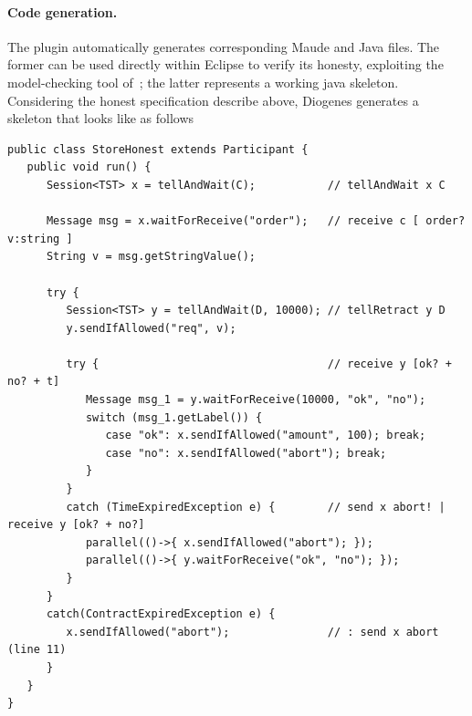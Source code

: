 \paragraph{Code generation.}
The plugin automatically generates corresponding Maude and Java files.
The former can be used directly within Eclipse to verify its honesty,
exploiting the model-checking tool of~\cite{verifiable};
the latter represents a working java skeleton. 
Considering the honest specification describe above,
Diogenes generates a skeleton that looks like as follows
\begin{mdframed}
\begin{verbatim}
public class StoreHonest extends Participant { 
   public void run() {
      Session<TST> x = tellAndWait(C);           // tellAndWait x C
       
      Message msg = x.waitForReceive("order");   // receive c [ order? v:string ]
      String v = msg.getStringValue();
      
      try {
         Session<TST> y = tellAndWait(D, 10000); // tellRetract y D
         y.sendIfAllowed("req", v);
         
         try {                                   // receive y [ok? + no? + t]
            Message msg_1 = y.waitForReceive(10000, "ok", "no");
            switch (msg_1.getLabel()) {                    
               case "ok": x.sendIfAllowed("amount", 100); break;
               case "no": x.sendIfAllowed("abort"); break;                    
            }
         }
         catch (TimeExpiredException e) {        // send x abort! | receive y [ok? + no?] 
            parallel(()->{ x.sendIfAllowed("abort"); });
            parallel(()->{ y.waitForReceive("ok", "no"); });
         }            
      }
      catch(ContractExpiredException e) {
         x.sendIfAllowed("abort");               // : send x abort (line 11)
      } 
   }
}
\end{verbatim}
\end{mdframed}


